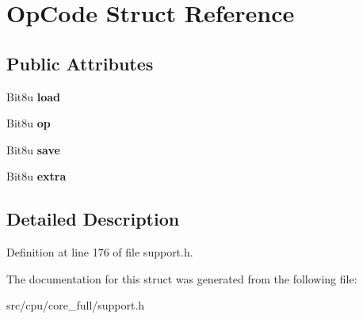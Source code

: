 \hypertarget{structOpCode}{\section{Op\-Code Struct Reference}
\label{structOpCode}
}
\subsection*{Public Attributes}
\begin{DoxyCompactItemize}
\item 
\hypertarget{structOpCode_a2a15f0dec79883cdebf4f5eb78ca5a15}{Bit8u {\bfseries load}}\label{structOpCode_a2a15f0dec79883cdebf4f5eb78ca5a15}

\item 
\hypertarget{structOpCode_a19e02ccfa033e6c6e7ccb67dd22517ef}{Bit8u {\bfseries op}}\label{structOpCode_a19e02ccfa033e6c6e7ccb67dd22517ef}

\item 
\hypertarget{structOpCode_af3430bdc0151ab95a10e9fa221256284}{Bit8u {\bfseries save}}\label{structOpCode_af3430bdc0151ab95a10e9fa221256284}

\item 
\hypertarget{structOpCode_ad626ad5c7c0e628d008384e6ab871d36}{Bit8u {\bfseries extra}}\label{structOpCode_ad626ad5c7c0e628d008384e6ab871d36}

\end{DoxyCompactItemize}


\subsection{Detailed Description}


Definition at line 176 of file support.\-h.



The documentation for this struct was generated from the following file\-:\begin{DoxyCompactItemize}
\item 
src/cpu/core\-\_\-full/support.\-h\end{DoxyCompactItemize}
